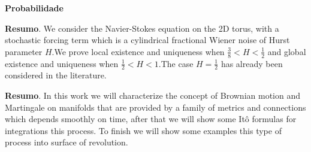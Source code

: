 
\pagestyle{fancy}

\lhead{}
\rhead{}


\renewcommand{\headrulewidth}{0.4pt}
\renewcommand{\footrulewidth}{0.4pt}


\begin{center}
	\huge{{\bf Probabilidade}}
	\vspace{1cm}
\end{center}

	
	
	
	\noindent\textbf{Resumo}.\label{co} 
	We consider the Navier-Stokes equation on the 2D torus, with a stochastic forcing term  which is a cylindrical fractional Wiener noise of Hurst parameter $H$.We prove local existence and uniqueness when $\frac 38< H<\frac 12$ and global existence and uniqueness when $\frac 12<H<1$.The case $H=\frac12$ has already been considered in the literature.
	
	\vspace{24pt}

	
	
	\noindent\textbf{Resumo}.\label{ean} 
	In this work we will characterize the concept of Brownian motion and Martingale on manifolds that are provided by a family of metrics and connections which depends smoothly on time, after that we will show some Itô formulas for integrations this process. To finish we will show some examples this type of process into surface of revolution.
	

